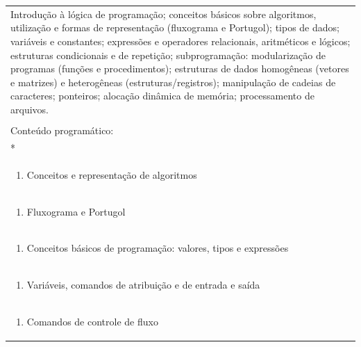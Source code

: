 \documentclass[11pt]{article}
\begin{document}
\begin{center}
\begin{longtable}{|p{4cm}|p{4cm}|p{4cm}|p{4cm}|}
\multicolumn{4}{|p{\dimexpr 16cm + 6\tabcolsep\relax}|}{Introdução à lógica de programação; conceitos básicos sobre algoritmos, utilização e formas de representação (fluxograma e Portugol); tipos de dados; variáveis e constantes; expressões e operadores relacionais, aritméticos e lógicos; estruturas condicionais e de repetição; subprogramação: modularização de programas (funções e procedimentos); estruturas de dados homogêneas (vetores e matrizes) e heterogêneas (estruturas/registros); manipulação de cadeias de caracteres; ponteiros; alocação dinâmica de memória; processamento de arquivos.}\\
\multicolumn{4}{|p{16cm}|}{}\\
\hline
\multicolumn{4}{|p{16cm}|}{Conteúdo programático:}\\*
\multicolumn{4}{|p{\dimexpr 16cm + 6\tabcolsep\relax}|}{\begin{enumerate}[start=1]\item Representação de dados\end{enumerate}}\\
\multicolumn{4}{|p{\dimexpr 16cm + 6\tabcolsep\relax}|}{\begin{enumerate}[start=2]\item Conceitos e representação de algoritmos\end{enumerate}}\\
\multicolumn{4}{|p{\dimexpr 16cm + 6\tabcolsep\relax}|}{\begin{enumerate}[start=3]\item Fluxograma e Portugol\end{enumerate}}\\
\multicolumn{4}{|p{\dimexpr 16cm + 6\tabcolsep\relax}|}{\begin{enumerate}[start=4]\item Conceitos básicos de programação: valores, tipos e expressões\end{enumerate}}\\
\multicolumn{4}{|p{\dimexpr 16cm + 6\tabcolsep\relax}|}{\begin{enumerate}[start=5]\item Variáveis, comandos de atribuição e de entrada e saída\end{enumerate}}\\
\multicolumn{4}{|p{\dimexpr 16cm + 6\tabcolsep\relax}|}{\begin{enumerate}[start=6]\item Comandos de controle de fluxo\end{enumerate}}\\

\end{longtable}
\end{center}
\end{document}
